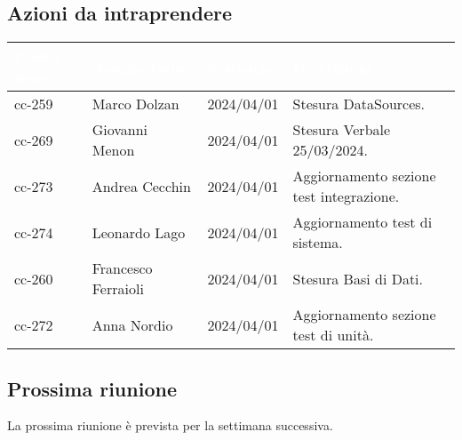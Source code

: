 \subsection{Azioni da intraprendere}
{
    \setlength{\tabcolsep}{10pt}
            \renewcommand{\arraystretch}{1.5}
            \begin{tabularx}{\textwidth}{| l | l | l | X |}
                 \hline
                 \rowcolor{headerrow}\textbf{\textcolor{white}{Codice issue}} & \textbf{\textcolor{white}{Assegnatario}} & \textbf{\textcolor{white}{Scadenza}} & \textbf{\textcolor{white}{Descrizione}} \\
                 \hline
                 cc-259 & Marco Dolzan & 2024/04/01 & Stesura DataSources. \\
                 \hline
                 cc-269 & Giovanni Menon & 2024/04/01 & Stesura Verbale 25/03/2024. \\
                 \hline
                 cc-273 & Andrea Cecchin & 2024/04/01 & Aggiornamento sezione test integrazione. \\
                 \hline
                 cc-274 & Leonardo Lago & 2024/04/01 & Aggiornamento test di sistema. \\
                \hline
                 cc-260 & Francesco Ferraioli & 2024/04/01 & Stesura Basi di Dati. \\
                 \hline
                  cc-272 & Anna Nordio & 2024/04/01 & Aggiornamento sezione test di unità. \\
                 \hline
            \end{tabularx}
}


\subsection{Prossima riunione} \label{subsec:riunione}
La prossima riunione è prevista per la settimana successiva.